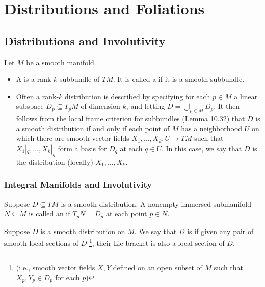 \documentclass[../main.tex]{subfiles}
\begin{document}
\ifSubfilesClassLoaded{

    
}{}

\chapter{ Distributions and Foliations }
\section{Distributions and Involutivity}
\begin{definition}{}{}
    Let $M$ be a smooth manifold.
    \begin{itemize}
        \item  A  is a rank-$k$ subbundle of $TM$. It is called a  if it is a smooth subbundle. 
        \item Often a rank-$k$ distribution is described by specifying for each $p \in M$ a linear subspace $D_p \subseteq T_p M$ of dimension $k$, and letting $D = \bigcup_{p \in M} D_p$. It then follows from the local frame criterion for subbundles (Lemma 10.32) that $D$ is a smooth distribution if and only if each point of $M$ has a neighborhood $U$ on which there are smooth vector fields $X_1, \dots, X_k: U \to TM$ such that $X_1|_q, \dots, X_k|_q$ form a basis for $D_q$ at each $q \in U$. In this case, we say that $D$ is the distribution (locally)  $X_1, \dots, X_k$.


    \end{itemize}
    
\end{definition}

\subsection{Integral Manifolds and Involutivity}

\begin{definition}{}{}
    Suppose $D \subseteq TM$ is a smooth distribution. A nonempty immersed submanifold $N \subseteq M$ is called an  if $T_p N = D_p$ at each point $p \in N$. 
\end{definition}

\begin{definition}{}{}
    Suppose $D$ is a smooth distribution on $M$. We say that $D$ is  if given any pair of smooth local sections of $D$ \footnote{(i.e., smooth vector fields $X, Y$ defined on an open subset of $M$ such that $X_p, Y_p \in D_p$ for each $p$)}, their Lie bracket is also a local section of $D$.
\end{definition}
\end{document}
